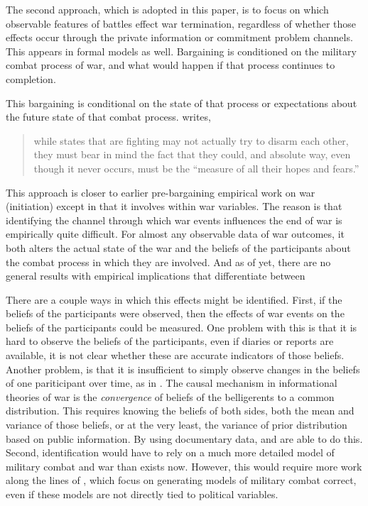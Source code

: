 The second approach, which is adopted in this paper, is to focus on which observable features of battles effect war termination, regardless of whether those effects occur through the private information or commitment problem channels. This appears in formal models as well. %
Bargaining is conditioned on the military combat process of war, and what would happen if that process continues to completion.

This bargaining is conditional on the state of that process or
expectations about the future state of that combat process.
\textcite[135]{Wagner2000} writes,
\begin{quotation}
  while states that are fighting may not actually try to disarm each
  other, they must bear in mind the fact that they could, and absolute
  way, even though it never occurs, must be the ``measure of all their
  hopes and fears.''
\end{quotation}

This approach is closer to earlier pre-bargaining empirical work on war (initiation) except in that it involves within war variables. %
The reason is that identifying the channel through which war events influences the end of war is empirically quite difficult. %
For almost any observable data of war outcomes, it both alters the actual state of the war and the beliefs of the participants about the combat process in which they are involved. %
And as of yet, there are no general results with empirical implications that differentiate between 

There are a couple ways in which this effects might be identified. %
First, if the beliefs of the participants were observed, then the effects of war events on the beliefs of the participants could be measured. %
One problem with this is that it is hard to observe the beliefs of the participants, even if diaries or reports are available, it is not clear whether these are accurate indicators of those beliefs. %
Another problem, is that it is insufficient to simply observe changes in the beliefs of one pariticipant over time, as in \textcite{Reiter2009}. %
The causal mechanism in informational theories of war is the \textit{convergence} of beliefs of the belligerents to a common distribution. %
This requires knowing the beliefs of both sides, both the mean and variance of those beliefs, or at the very least, the variance of prior distribution based on public information. %
By using documentary data, \textcite{Goemans2000} and \textcite{Reiter2009} are able to do this.
Second, identification would have to rely on a much more detailed model of military combat and war than exists now.
However, this would require more work along the lines of \textcite{Biddle2004}, which focus on generating models of military combat correct, even if these models are not directly tied to political variables.

